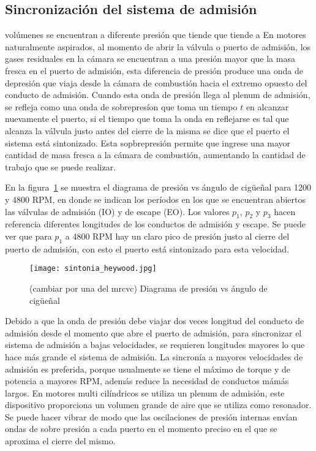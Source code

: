 
\subsection{Sincronización del sistema de admisión}
%
volúmenes se encuentran a diferente presión que tiende que tiende a
%
En motores naturalmente aspirados, al momento de abrir la válvula o puerto de
admisión, los gases residuales en la cámara se encuentran a una presión mayor
que la masa fresca en el puerto de admisión, esta diferencia de presión produce
una onda de depresión que viaja desde la cámara de combustión hacia el extremo
opuesto del conducto de admisión.
%
Cuando esta onda de presión llega al plenum de admisión, se refleja como una
onda de sobrepresíon que toma un tiempo $t$ en alcanzar nuevamente el puerto, si
el tiempo que toma la onda en reflejarse es tal que alcanza la válvula justo
antes del cierre de la misma se dice que el puerto el sistema está sintonizado.
%
Esta sopbrepresión permite que ingrese una mayor cantidad de masa fresca a la
cámara de combustión, aumentando la cantidad de trabajo que se puede realizar.

En la figura~\ref{fig:sintonia1} se muestra el diagrama de presión vs ángulo de
cigüeñal para 1200 y 4800 RPM, en donde se indican los períodos en los que se
encuentran abiertos las válvulas de admisión (IO) y de escape (EO).
%
Los valores $p_1$, $p_2$ y $p_3$ hacen referencia diferentes longitudes de los
conductos de admisión y escape.
%
Se puede ver que para $p_1$ a 4800 RPM hay un claro pico de presión justo al
cierre del puerto de admisión, con esto el puerto está sintonizado para esta
velocidad.

\begin{figure} \centering
\texttt{[image: sintonia\_heywood.jpg]}
    \caption{(cambiar por una del mrcvc) Diagrama de presión vs ángulo de
cigüeñal}\label{fig:sintonia1}
\end{figure}

Debido a que la onda de presión debe viajar dos veces longitud del conducto de
admisión desde el momento que abre el puerto de admisión, para sincronizar el
sistema de admisión a bajas velocidades, se requieren longitudes mayores lo que
hace más grande el sistema de admisión.
%
La sincronía a mayores velocidades de admisión es preferida, porque usualmente
se tiene el máximo de torque y de potencia a mayores RPM, además reduce la
necesidad de conductos mámás largos.
%
En motores multi cilíndricos se utiliza un plenum de admisión, este dispositivo
proporciona un volumen grande de aire que se utiliza como resonador.
%
Se puede hacer vibrar de modo que las oscilaciones de presión internas envían
ondas de sobre presión a cada puerto en el momento preciso en el que se aproxima
el cierre del mismo.

